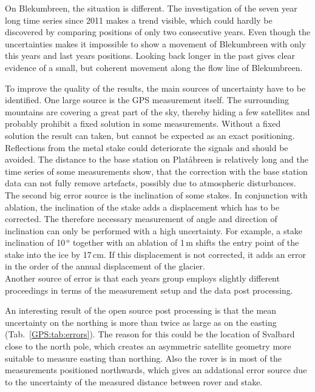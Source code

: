 On Blekumbreen, the situation is different.
The investigation of the seven year long time series since 2011 makes a trend visible,
which could hardly be discovered by comparing positions of only two consecutive years.
Even though the uncertainties makes it impossible to show a movement of Blekumbreen with only this years
and last years positions.
Looking back longer in the past gives clear evidence of a small, but coherent movement along the flow line of Blekumbreen.

To improve the quality of the results,
the main sources of uncertainty have to be identified.
One large source is the GPS measurement itself.
The surrounding mountains are covering a great part of the sky,
thereby hiding a few satellites and probably prohibit a fixed solution in some measurements.
Without a fixed solution the result can taken, but cannot be expected as an exact positioning.
Reflections from the metal stake could deteriorate the signals and should be avoided.
The distance to the base station on Platåbreen is relatively long and the time series of some measurements show,
that the correction with the base station data can not fully remove artefacts,
possibly due to atmospheric disturbances.\\
The second big error source is the inclination of some stakes.
In conjunction with ablation, the inclination of the stake adds a displacement which has to be corrected.
The therefore necessary measurement of angle and direction of inclination can only be performed with a high uncertainty.
For example, a stake inclination of 10\,$^\text{o}$ together with an ablation of 1\,m shifts the entry point of the stake
into the ice by 17\,cm.
If this displacement is not corrected,
it adds an error in the order of the annual displacement of the glacier.\\
Another source of error is that each years group employs slightly different proceedings in terms
of the measurement setup and the data post processing.

An interesting result of the open source post processing is that the mean uncertainty on the northing is
more than twice as large as on the easting (Tab.~\ref{GPS:tab:errors}).
The reason for this could be the location of Svalbard close to the north pole,
which creates an asymmetric satellite geometry more suitable to measure easting than northing.
Also the rover is in most of the measurements positioned northwards, 
which gives an addational error source due to the uncertainty of the measured distance between rover and stake.

